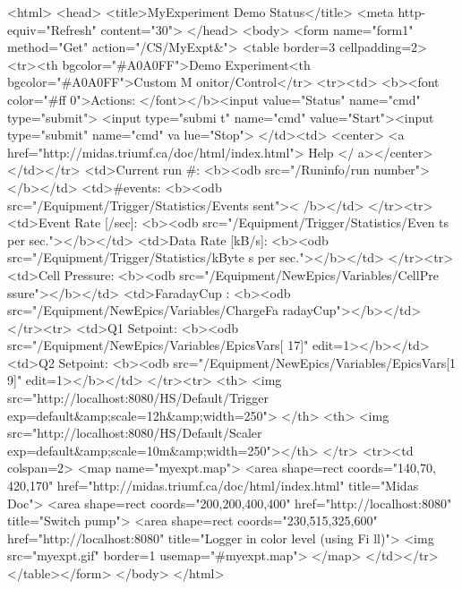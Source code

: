\begin{DoxyCode}
<html>
  <head>
   <title>MyExperiment Demo Status</title>
   <meta http-equiv="Refresh" content="30">
  </head>
 <body>
  <form name="form1" method="Get" action="/CS/MyExpt&">
     <table border=3 cellpadding=2>
          <tr><th bgcolor="#A0A0FF">Demo Experiment<th bgcolor="#A0A0FF">Custom M
      onitor/Control</tr> 
          <tr><td> <b><font color="#ff 0">Actions: </font></b><input
                      value="Status" name="cmd" type="submit"> <input type="submi
      t"
                      name="cmd" value="Start"><input type="submit" name="cmd" va
      lue="Stop">
           </td><td>
           <center> <a href="http://midas.triumf.ca/doc/html/index.html"> Help </
      a></center>
           </td></tr>
           <td>Current run #: <b><odb src="/Runinfo/run number"></b></td>
           <td>#events: <b><odb src="/Equipment/Trigger/Statistics/Events sent"><
      /b></td>
           </tr><tr>
           <td>Event Rate [/sec]: <b><odb src="/Equipment/Trigger/Statistics/Even
      ts per sec."></b></td>
           <td>Data Rate [kB/s]: <b><odb src="/Equipment/Trigger/Statistics/kByte
      s per sec."></b></td>
            </tr><tr>
            <td>Cell Pressure: <b><odb src="/Equipment/NewEpics/Variables/CellPre
      ssure"></b></td>
           <td>FaradayCup   : <b><odb src="/Equipment/NewEpics/Variables/ChargeFa
      radayCup"></b></td>
           </tr><tr>
           <td>Q1 Setpoint: <b><odb src="/Equipment/NewEpics/Variables/EpicsVars[
      17]" edit=1></b></td>
          <td>Q2 Setpoint: <b><odb src="/Equipment/NewEpics/Variables/EpicsVars[1
      9]" edit=1></b></td>
          </tr><tr>
          <th> <img src="http://localhost:8080/HS/Default/Trigger%
                          exp=default&amp;scale=12h&amp;width=250">
          </th>
          <th> <img src="http://localhost:8080/HS/Default/Scaler%
                          exp=default&amp;scale=10m&amp;width=250"></th>
          </tr>
          <tr><td colspan=2>
          <map name="myexpt.map">
          <area shape=rect coords="140,70, 420,170" 
                  href="http://midas.triumf.ca/doc/html/index.html" title="Midas 
      Doc">
          <area shape=rect coords="200,200,400,400"
                  href="http://localhost:8080" title="Switch pump">
       <area shape=rect coords="230,515,325,600"
              href="http://localhost:8080" title="Logger in color level (using Fi
      ll)">
        <img src="myexpt.gif" border=1 usemap="#myexpt.map">
          </map>
          </td></tr>
     </table></form>
   </body>
  </html>  
\end{DoxyCode}


